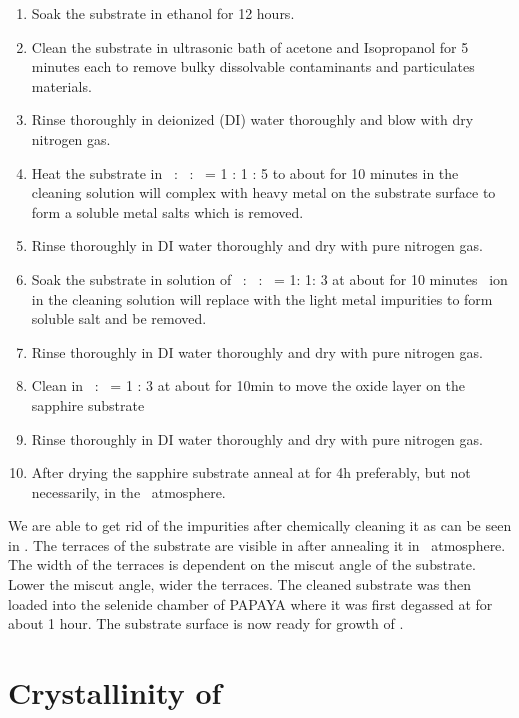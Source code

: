 \begin{enumerate}
    \item Soak the substrate in ethanol for 12 hours.
    \item Clean the substrate in ultrasonic bath of acetone and Isopropanol for 5 minutes each to remove 
    bulky dissolvable contaminants and particulates materials.
    \item Rinse thoroughly in deionized (DI) water thoroughly and blow with dry nitrogen gas.
    \item Heat the substrate in \ammonia\ : \peroxide\ :  \water\ = 1 : 1 : 5 to about  for 10 minutes \ammoniumion in the 
    cleaning solution will complex with heavy metal on the substrate surface to form a soluble metal salts which is removed.
    \item Rinse thoroughly in DI water thoroughly and dry with pure nitrogen gas.
    \item Soak the substrate in solution of \hcl\ : \peroxide\ : \water\ = 1: 1: 3 at about  for 10 minutes \hydrogenion\ ion 
    in the cleaning solution will replace with the light metal impurities to form soluble salt and be removed.
    \item Rinse thoroughly in DI water thoroughly and dry with pure nitrogen gas.
    \item Clean in \sulphuricacid\ : \phosphoricacid\ = 1 : 3 at about  for 10min to move the oxide layer on the sapphire substrate
    \item Rinse thoroughly in DI water thoroughly and dry with pure nitrogen gas.
    \item After drying the sapphire substrate anneal at  for 4h preferably, but not necessarily, in the \oxygen\ atmosphere.
\end{enumerate}



We are able to get rid of the impurities after chemically cleaning it as can be seen in .
The terraces of the substrate are visible in  after annealing it in \oxygen\ atmosphere.
The width of the terraces is dependent on the miscut angle of the substrate. Lower the miscut angle, 
wider the terraces. The cleaned substrate was then loaded into the selenide chamber of PAPAYA where 
it was first degassed at  for about 1 hour. The substrate surface is now ready for growth of \nbse. \\

\section{Crystallinity of \nbse}

